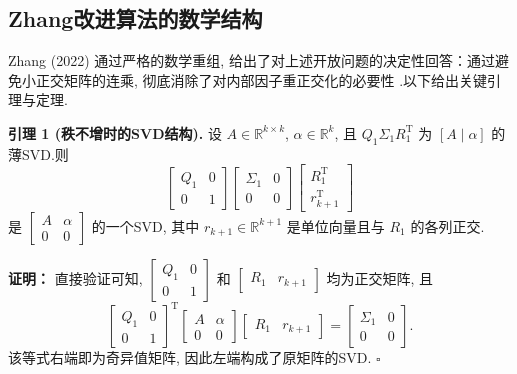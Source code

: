 \subsection{Zhang改进算法的数学结构}
Zhang (2022) 通过严格的数学重组, 给出了对上述开放问题的决定性回答：通过避免小正交矩阵的连乘, 彻底消除了对内部因子重正交化的必要性 \cite{zhang2022}.以下给出关键引理与定理.

\noindent\textbf{引理 1 (秩不增时的SVD结构).} 
设 $A\in\mathbb{R}^{k\times k}$, $\alpha\in\mathbb{R}^k$, 且 $Q_1\Sigma_1R_1^{\mathrm T}$ 为 $[A\mid\alpha]$ 的薄SVD.则
\begin{equation}
\begin{bmatrix}Q_1 & 0\\0 & 1\end{bmatrix}
\begin{bmatrix}\Sigma_1 & 0\\0 & 0\end{bmatrix}
\begin{bmatrix}R_1^{\mathrm T}\\ r_{k+1}^{\mathrm T}\end{bmatrix}
\end{equation}
是 $\begin{bmatrix}A & \alpha\\0 & 0\end{bmatrix}$ 的一个SVD, 其中 $r_{k+1}\in\mathbb{R}^{k+1}$ 是单位向量且与 $R_1$ 的各列正交.

\noindent\textbf{证明：} 直接验证可知, $\begin{bmatrix}Q_1 & 0\\0 & 1\end{bmatrix}$ 和 $\begin{bmatrix}R_1 & r_{k+1}\end{bmatrix}$ 均为正交矩阵, 且
\begin{equation}
\begin{bmatrix}Q_1 & 0\\0 & 1\end{bmatrix}^{\mathrm T} \begin{bmatrix}A & \alpha\\0 & 0\end{bmatrix} \begin{bmatrix}R_1 & r_{k+1}\end{bmatrix} = \begin{bmatrix}\Sigma_1 & 0\\0 & 0\end{bmatrix}.
\end{equation}
该等式右端即为奇异值矩阵, 因此左端构成了原矩阵的SVD. $\square$

